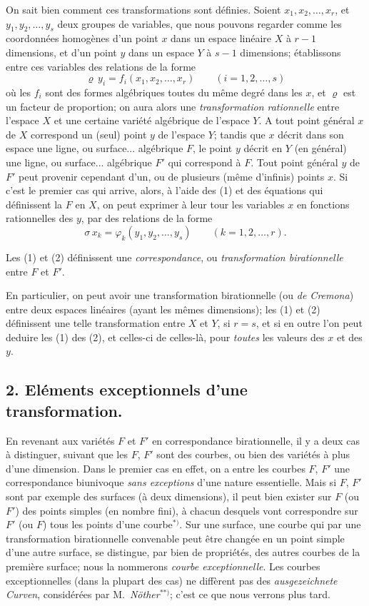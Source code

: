 \documentclass{article}
\begin{document}
On sait bien comment ces transformations sont définies. Soient $x_{1}, x_{2}, \ldots , x_{r}$, et $y_{1}, y_{2}, \ldots , y_{s}$ deux groupes de variables, que nous pouvons regarder comme les coordonnées homogènes d'un point $x$ dans un espace linéaire $X$ à $r-1$ dimensions, et d'un point $y$ dans un espace $Y$ à $s-1$ dimensions; établissons entre ces variables des relations de la forme
\[ \varrho\, y_{i} = f_{i}(x_{1}, x_{2}, \ldots , x_{r}) \qquad (i = 1, 2, \ldots , s) \tag{1} \]
où les $f_{i}$ sont des formes algébriques toutes du même degré dans les $x$, et $\varrho$ est un facteur de proportion; on aura alors une \emph{transformation rationnelle} entre l'espace $X$ et une certaine variété algébrique de l'espace $Y$. A tout point général $x$ de $X$ correspond un (seul) point $y$ de l'espace $Y$; tandis que $x$ décrit dans son espace une ligne, ou surface... algébrique $F$, le point $y$ décrit en $Y$ (en général) une ligne, ou surface... algébrique $F'$ qui correspond à $F$. Tout point général $y$ de $F'$ peut provenir cependant d'un, ou de plusieurs (même d'infinis) points $x$. Si c'est le premier cas qui arrive, alors, à l'aide des (1) et des équations qui définissent la $F$ en $X$, on peut exprimer à leur tour les variables $x$ en fonctions rationnelles des $y$, par des relations de la forme
\[ \sigma\, x_{k} = \varphi_{k}(y_{1}, y_{2}, \ldots , y_{s}) \qquad (k = 1, 2, \ldots , r). \tag{2} \]

Les (1) et (2) définissent une \emph{correspondance}, ou \emph{transformation birationnelle} entre $F$ et $F'$.


En particulier, on peut avoir une transformation birationnelle (ou \emph{de Cremona}) entre deux espaces linéaires (ayant les mêmes dimensions); les (1) et (2) définissent une telle transformation entre $X$ et $Y$, si $r = s$, et si en outre l'on peut deduire les (1) des (2), et celles-ci de celles-là, pour \emph{toutes} les valeurs des $x$ et des $y$.

\subsection*{2. Eléments exceptionnels d'une transformation.}

En revenant aux variétés $F$ et $F'$ en correspondance birationnelle, il y a deux cas à distinguer, suivant que les $F$, $F'$ sont des courbes, ou bien des variétés à plus d'une dimension. Dans le premier cas en effet, on a entre les courbes $F$, $F'$ une correspondance biunivoque \emph{sans exceptions} d'une nature essentielle. Mais si $F$, $F'$ sont par exemple des surfaces (à deux dimensions), il peut bien exister sur $F$ (ou $F'$) des points simples (en nombre fini), à chacun desquels vont correspondre sur $F'$ (ou $F$) tous les points d'une courbe${}^{*)}$. Sur une surface, une courbe qui par une transformation birationnelle convenable peut être changée en un point simple d'une autre surface, se distingue, par bien de propriétés, des autres courbes de la première surface; nous la nommerons \emph{courbe exceptionnelle}. Les courbes exceptionnelles (dans la plupart des cas) ne diffèrent pas des \emph{ausgezeichnete Curven}, considérées par M.\ \emph{Nöther}${}^{**)}$; c'est ce que nous verrons plus tard.
\end{document}
